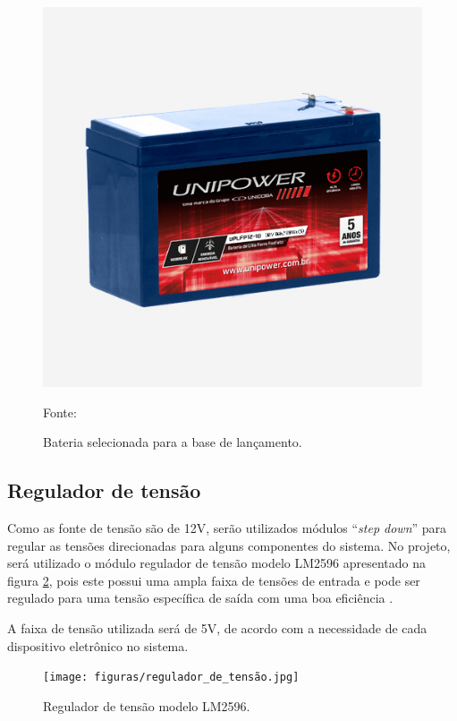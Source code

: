 \begin{figure}[!h]
	\centering
	\label{bateria_base}
		\includegraphics[keepaspectratio=true,scale=0.6]{figuras/bateria_base.jpg}
	\caption{Bateria selecionada para a base de lançamento. }
	{\footnotesize Fonte: \cite{datasheet_bateria}}
	\label{fig:bateriabase}
\end{figure}

\subsection{Regulador de tensão}

Como as fonte de tensão são de 12V, serão utilizados módulos “\textit{step down}” para regular as tensões direcionadas para alguns componentes do sistema. No projeto, será utilizado o módulo regulador de tensão modelo LM2596 apresentado na figura \ref{fig:regulador tensao}, pois este possui uma ampla faixa de tensões de entrada e pode ser regulado para uma tensão específica de saída com uma boa eficiência \cite{datasheet_regulador}.

A faixa de tensão utilizada será de 5V, de acordo com a necessidade de cada dispositivo eletrônico no sistema.

\begin{figure}[!h]
	\centering
	\label{regulador_tensão}
		\texttt{[image: figuras/regulador\_de\_tensão.jpg]}
	\caption{Regulador de tensão modelo LM2596.}
	\label{fig:regulador tensao}
\end{figure}

